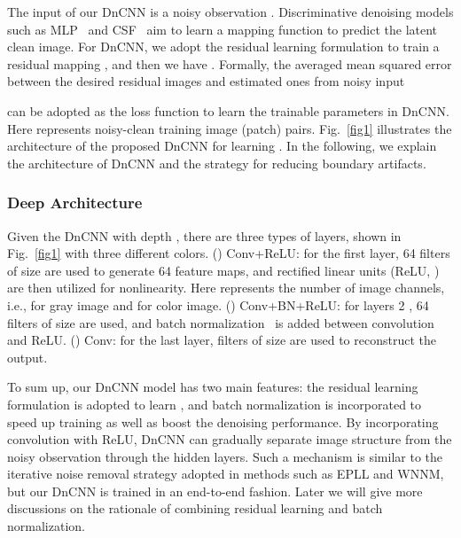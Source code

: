 \documentclass[journal]{IEEEtran}
\begin{document}
The input of our DnCNN is a noisy observation . Discriminative denoising models such as MLP~\cite{burger2012image} and CSF~\cite{schmidt2014shrinkage} aim to learn a mapping function  to predict the latent clean image. For DnCNN, we adopt the residual learning formulation to train a residual mapping , and then we have .
Formally, the averaged mean squared error between the desired residual images and estimated ones from noisy input

can be adopted as the loss function to learn the trainable parameters  in DnCNN. Here  represents  noisy-clean training image (patch) pairs. Fig.~\ref{fig1} illustrates the architecture of the proposed DnCNN for learning . In the following, we explain the architecture of DnCNN and the strategy for reducing boundary artifacts.


\subsubsection{Deep Architecture}
Given the DnCNN with depth , there are three types of layers, shown in Fig.~\ref{fig1} with three different colors. () Conv+ReLU: for the first layer, 64 filters of size 
 are used to generate 64 feature maps, and rectified linear units (ReLU, ) are then utilized for nonlinearity. Here  represents the number of image channels, i.e.,  for gray image and  for color image. () Conv+BN+ReLU: for layers 2  , 64 filters of size  are used, and batch normalization~\cite{ioffe2015batch} is added  between convolution and ReLU. () Conv: for the last layer,  filters of size  are used to reconstruct the output.

To sum up, our DnCNN model has two main features: the residual learning formulation is adopted to learn , and batch normalization is incorporated to speed up training as well as boost the denoising performance.
By incorporating convolution with ReLU, DnCNN can gradually separate image structure from the noisy observation through the hidden layers. Such a mechanism is similar to the iterative noise removal strategy adopted in methods such as EPLL and WNNM, but our DnCNN is trained in an end-to-end fashion.
Later we will give more discussions on the rationale of combining residual learning and batch normalization.
\end{document}
